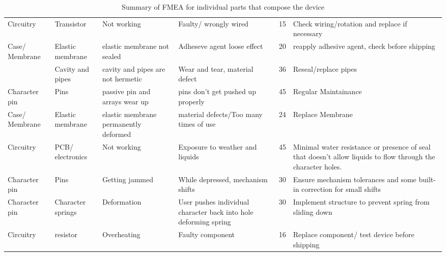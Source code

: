 \begin{table}[!ht]
\begin{tabular}{b{1.7cm} b{2cm} b{2.5cm} b{4cm}l b{6cm}}
            Circuitry & Transistor  & Not working & Faulty/ wrongly wired & 15 & Check wiring/rotation and replace if necessary \\ 
            Case/ Membrane & Elastic membrane & elastic membrane not sealed & Adheseve agent loose effect & 20 & reapply adhesive agent, check before shipping \\ 
            ~ & Cavity and pipes & cavity and pipes are not hermetic & Wear and tear, material defect & 36 & Reseal/replace pipes \\ 
            Character pin & Pins & passive pin and arrays wear up & pins don't get pushed up properly & 45 & Regular Maintainance \\ 
            Case/ Membrane & Elastic membrane & elastic membrane permanently deformed & material defects/Too many times of use & 24 & Replace Membrane  \\ 
            Circuitry & PCB/ electronics & Not working & Exposure to weather and liquids & 45 & Minimal water resistance or presence of seal that doesn't allow liquids to flow through the character holes. \\ 
            Character pin & Pins & Getting jammed & While depressed, mechanism shifts & 30 & Ensure mechanism tolerances and some built-in correction for small shifts \\ 
            Character pin & Character springs & Deformation & User pushes individual character back into hole deforming spring & 30 & Implement structure to prevent spring from sliding down \\ 
            Circuitry & resistor & Overheating & Faulty component & 16 & Replace component/ test device before shipping \\ \hline
        \end{tabular}
        \caption{Summary of FMEA for individual parts that compose the device}
    \end{table}
    \clearpage
